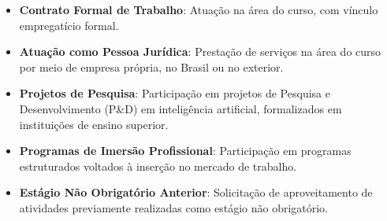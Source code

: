 \begin{itemize}
    \item \textbf{Contrato Formal de Trabalho}: Atuação na área do curso, com vínculo empregatício formal.
    \item \textbf{Atuação como Pessoa Jurídica}: Prestação de serviços na área do curso por meio de empresa própria, no Brasil ou no exterior.
    \item \textbf{Projetos de Pesquisa}: Participação em projetos de Pesquisa e Desenvolvimento (P\&D) em inteligência artificial, formalizados em instituições de ensino superior.
    \item \textbf{Programas de Imersão Profissional}: Participação em programas estruturados voltados à inserção no mercado de trabalho.
    \item \textbf{Estágio Não Obrigatório Anterior}: Solicitação de aproveitamento de atividades previamente realizadas como estágio não obrigatório.
\end{itemize}








